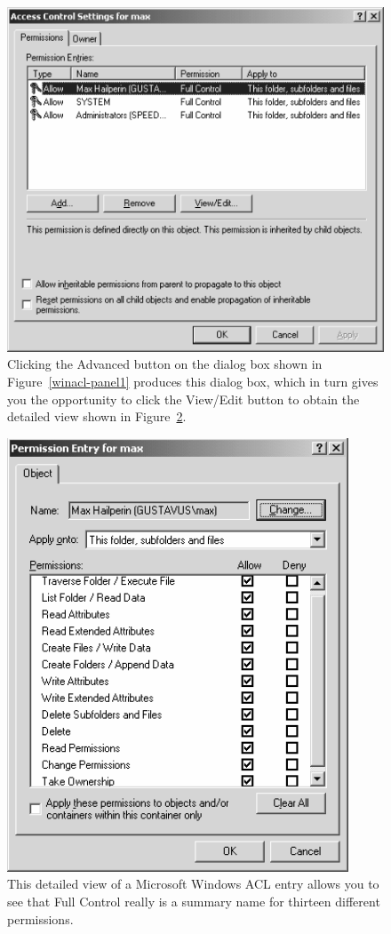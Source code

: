 \begin{figure}
\centerline{\includegraphics{hail_f0714}}
\caption{Clicking the Advanced button on the dialog box shown in
  Figure~\ref{winacl-panel1} produces this dialog box, which in turn
  gives you the opportunity to click the View/Edit button to obtain
  the detailed view shown in Figure~\ref{winacl-panel3}.}
\label{winacl-panel2}
\end{figure}
\begin{figure}
\centerline{\includegraphics{hail_f0715}}
\caption{This detailed view of a Microsoft Windows
  ACL entry allows you to see that Full Control really is a summary
  name for thirteen different permissions.}
\label{winacl-panel3}
\end{figure}

